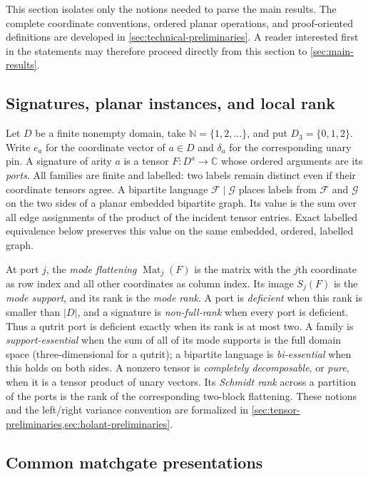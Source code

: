 \documentclass[11pt]{article}
\theoremstyle{definition}
\theoremstyle{remark}
\newcommand{\C}{\mathbb C}
\newcommand{\cF}{\mathcal F}
\newcommand{\cG}{\mathcal G}
\newcommand{\Mat}{\operatorname{Mat}}
\begin{document}
This section isolates only the notions needed to parse the main results.
The complete coordinate conventions, ordered planar operations, and
proof-oriented definitions are developed in
\cref{sec:technical-preliminaries}.  A reader interested first in the
statements may therefore proceed directly from this section to
\cref{sec:main-results}.

\subsection{Signatures, planar instances, and local rank}
\label{sec:statement-signatures}

Let $D$ be a finite nonempty domain, take
$\mathbb N=\{1,2,\ldots\}$, and put $D_3=\{0,1,2\}$.  Write $e_a$ for the
coordinate vector of $a\in D$ and $\delta_a$ for the corresponding unary
pin.  A signature
of arity $a$ is a tensor $F\colon D^a\to\C$ whose ordered arguments are its
\emph{ports}.  All families are finite and labelled: two labels remain
distinct even if their coordinate tensors agree.  A bipartite language
$\cF\mid\cG$ places labels from $\cF$ and $\cG$ on the two sides of a
planar embedded bipartite graph.  Its value is the sum over all edge
assignments of the product of the incident tensor entries.  Exact labelled
equivalence below preserves this value on the same embedded, ordered,
labelled graph.

At port $j$, the \emph{mode flattening} $\Mat_j(F)$ is the matrix with the
$j$th coordinate as row index and all other coordinates as column index.
Its image $S_j(F)$ is the \emph{mode support}, and its rank is the
\emph{mode rank}.  A port is \emph{deficient} when this rank is smaller
than $|D|$, and a signature is \emph{non-full-rank} when every port is
deficient.  Thus a qutrit port is deficient exactly when its rank is at
most two.  A family is \emph{support-essential} when the sum of all of its
mode supports is the full domain space (three-dimensional for a qutrit); a bipartite
language is \emph{bi-essential} when this holds on both sides.  A nonzero
tensor is \emph{completely decomposable}, or \emph{pure}, when it is a
tensor product of unary vectors.  Its \emph{Schmidt rank} across a partition
of the ports is the rank of the corresponding two-block flattening.  These
notions and the left/right variance convention are formalized in
\cref{sec:tensor-preliminaries,sec:holant-preliminaries}.

\subsection{Common matchgate presentations}
\label{sec:statement-presentations}
\end{document}
